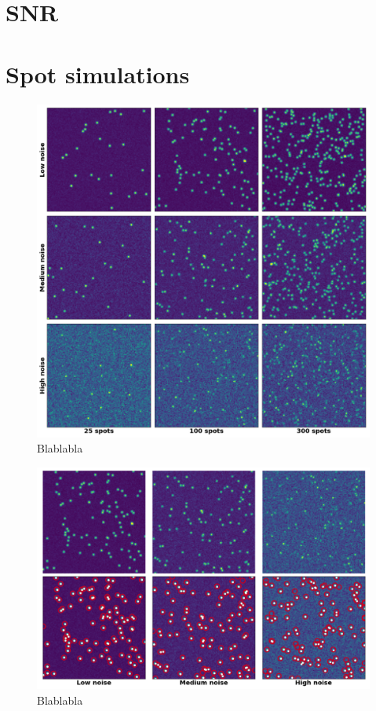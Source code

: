 
\graphicspath{{../../figures/chapter2/}}


\chapter{\ac{SNR}} \label{chap:appendix_snr}


\chapter{Spot simulations} \label{chap:appendix_simulation}

\begin{figure}[h]
    \centering
    \includegraphics[width=1\textwidth]{figures/chapter2/spots_mosaic}
    \caption{Blablabla}
    \label{fig:spots_mosaic}
\end{figure}

\begin{figure}[h]
    \centering
    \includegraphics[width=1\textwidth]{figures/chapter2/spots_example}
    \caption{Blablabla}
    \label{fig:detection_results_simulation}
\end{figure}


